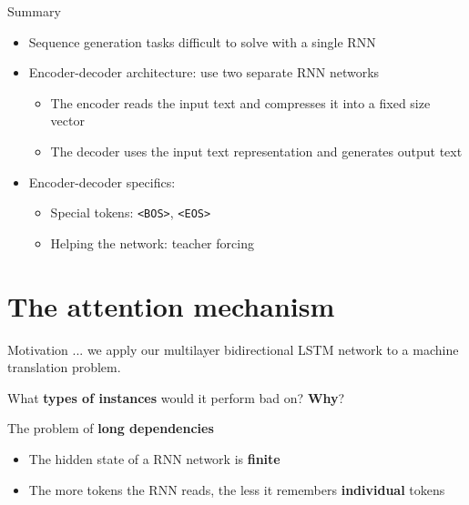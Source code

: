 \documentclass[12pt,aspectratio=169,handout]{beamer}
\begin{document}
\begin{frame}[fragile]{Summary}

	\begin{itemize}
		\item Sequence generation tasks difficult to solve with a single RNN
		\item Encoder-decoder architecture: use two separate RNN networks
		\begin{itemize}
			\item The encoder reads the input text and compresses it into a fixed size vector
			\item The decoder uses the input text representation and generates output text
		\end{itemize}
		\item Encoder-decoder specifics:
		\begin{itemize}
			\item Special tokens: \verb|<BOS>|, \verb|<EOS>|
			\item Helping the network: teacher forcing
		\end{itemize}
	\end{itemize}

\end{frame}

\section{The attention mechanism}

\begin{frame}{Motivation}
... we apply our multilayer bidirectional LSTM network to a machine translation problem.

What \textbf{types of instances} would it perform bad on? \textbf{Why}?

\vspace{1em}
\pause
The problem of \textbf{long dependencies}
\begin{itemize}
		\item The hidden state of a RNN network is \textbf{finite}
		\item The more tokens the RNN reads, the less it remembers \textbf{individual} tokens
	\end{itemize}

\end{frame}
\end{document}
